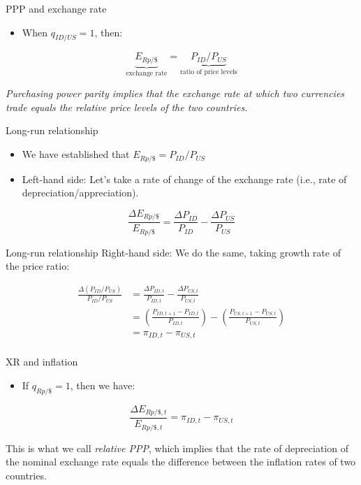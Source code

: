 \documentclass[
  ignorenonframetext,
]{beamer}
\providecommand{\tightlist}{%
  \setlength{\itemsep}{0pt}\setlength{\parskip}{0pt}}\usepackage{longtable,booktabs,array}
\begin{document}
\begin{frame}{PPP and exchange rate}
\label{ppp-and-exchange-rate-1}
\begin{itemize}
\tightlist
\item
  When \(q_{ID/US}=1\), then:
\end{itemize}

\begin{equation}
\underbrace{E_{Rp/\$}}_{\text{exchange rate}}=\underbrace{P_{ID}/P_{US}}_\text{ratio of price levels}
\end{equation}

\emph{Purchasing power parity implies that the exchange rate at which
two currencies trade equals the relative price levels of the two
countries.}
\end{frame}

\begin{frame}{Long-run relationship}
\label{long-run-relationship}
\begin{itemize}
\item
  We have established that \(E_{Rp/\$}=P_{ID}/P_{US}\)
\item
  Left-hand side: Let's take a rate of change of the exchange rate
  (i.e., rate of depreciation/appreciation).
\end{itemize}

\begin{equation}
\frac{\Delta E_{Rp/\$}}{E_{Rp/\$}}=\frac{\Delta P_{ID}}{P_{ID}}-\frac{\Delta P_{US}}{P_{US}}
\end{equation}
\end{frame}

\begin{frame}{Long-run relationship}
\label{long-run-relationship-1}
Right-hand side: We do the same, taking growth rate of the price ratio:

\begin{align*}
\frac{\Delta (P_{ID}/P_{US})}{P_{ID}/P_{US}}&=\frac{\Delta P_{ID,t}}{P_{ID,t}}-\frac{\Delta P_{US,t}}{P_{US,t}} \\
&=\left(\frac{P_{ID,t+1}-P_{ID,t}}{P_{ID,t}}\right)-\left(\frac{P_{US,t+1}-P_{US,t}}{P_{US,t}}\right) \\
&=\pi_{ID,t}-\pi_{US,t}\\

\end{align*}
\end{frame}

\begin{frame}{XR and inflation}
\label{xr-and-inflation}
\begin{itemize}
\tightlist
\item
  If \(q_{Rp/\$}=1\), then we have:
\end{itemize}

\begin{equation}
\frac{\Delta E_{Rp/\$,t}}{E_{Rp/\$,t}}=\pi_{ID,t}-\pi_{US,t}
\end{equation}

This is what we call \emph{relative PPP}, which implies that the rate of
depreciation of the nominal exchange rate equals the difference between
the inflation rates of two countries.
\end{frame}
\end{document}
